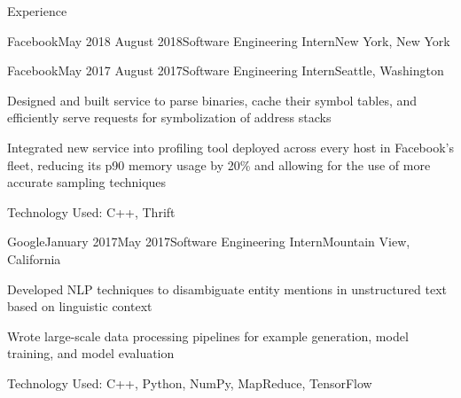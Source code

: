 \documentclass{resume} %
\begin{document}
\begin{rSection}{Experience}
\begin{rSubsection}{Facebook}{May 2018 \textminus August 2018}{Software Engineering Intern}{New York, New York}
\end{rSubsection}
\begin{rSubsection}{Facebook}{May 2017 \textminus August 2017}{Software Engineering Intern}{Seattle, Washington}
\item[] Designed and built service to parse binaries, cache their symbol tables, and efficiently serve requests for symbolization of address stacks
\item[] Integrated new service into profiling tool deployed across every host in Facebook's fleet, reducing its p90 memory usage by 20\% and allowing for the use of more accurate sampling techniques
\item[] Technology Used: C++, Thrift
\end{rSubsection}
\begin{rSubsection}{Google}{January 2017\textminus May 2017}{Software Engineering Intern}{Mountain View, California}
\item[] Developed NLP techniques to disambiguate entity mentions in unstructured text based on linguistic context
\item[] Wrote large-scale data processing pipelines for example generation, model training, and model evaluation
\item[] Technology Used: C++, Python, NumPy, MapReduce, TensorFlow
\end{rSubsection}
\end{rSection}







\end{document}

